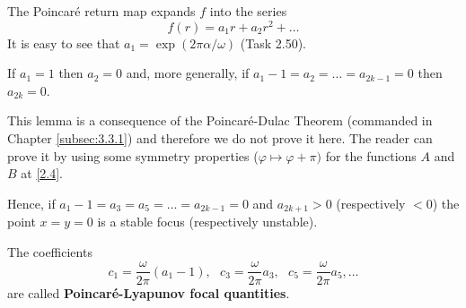 The Poincaré return map expands $ f $ into the series
\begin{equation}
\label{2.6}
f(r)=a_{1}r+a_{2}r^{2}+\ldots
\end{equation}
It is easy to see that $a_{1}=\exp \left( 2\pi \alpha /\omega \right)$ (Task 2.50).

\begin{lemma}
	If $a_{1}=1$ then $a_{2}=0$ and, more generally, if $a_{1}-1=a_{2}=\ldots =a_{2k-1}=0$ then $a_{2k}=0$.
\end{lemma}

This lemma is a consequence of the Poincaré-Dulac Theorem (commanded in Chapter \ref{subsec:3.3.1}) and therefore we do not prove it here.
The reader can prove it by using some symmetry properties ($ \varphi \longmapsto \varphi + \pi)$ for the functions $ A $ and $ B $ at \eqref{2.4}.

Hence, if $ a_ {1} -1 = a_ {3} = a_ {5} = \ldots = a_ {2k-1} = 0 $ and $ a_ {2k+1}>0$ (respectively $<0$) the point $ x = y = 0 $ is a stable focus (respectively unstable).
	
\begin{definition}\label{def:2.13}
	The coefficients
	$$
	c_{1}=\frac{\omega }{2\pi }(a_{1}-1),\text{ \ }c_{3}=\frac{\omega }{2\pi }%
	a_{3},\text{ \ }c_{5}=\frac{\omega }{2\pi }a_{5},\ldots
	$$
	are called \textbf{Poincaré-Lyapunov focal quantities}.
\end{definition}

